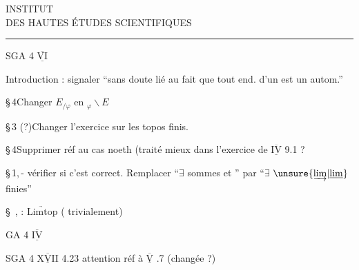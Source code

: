 
\begin{center}
INSTITUT\\
DES HAUTES ÉTUDES SCIENTIFIQUES\\
\rule{2.3em}{0.4pt}
\end{center}
SGA 4 $\underline{\overline{\mathrm{VI}}}$

Introduction : signaler  ``sans doute lié au fait que tout end. d'un  est un autom.''\unsure{)|\}}

\S\,4\qquad Changer \(E_{/\varphi}\) en \({}_{\varphi}\backslash E\)

\S\,3 (?)\qquad Changer l'exercice sur les topos finis.

\S\,4\qquad Supprimer réf au cas noeth (traité mieux dans l'exercice de $\underline{\overline{\mathrm{IV}}}$ 9.1 ?

\S\,1,\textemdash\,- vérifier si c'est correct. Remplacer ``$\exists$ sommes  et ''  par ``$\exists$ $\unsure{\underrightarrow{\mathrm{lim}}|\underline{\mathrm{lim}}}$ finies''

\S\ ,\qquad {} : $\underrightarrow{\mathrm{Limtop}}$ ( trivialement)

GA 4 $\underline{\overline{\mathrm{IV}}}$

SGA 4 $\underline{\overline{\mathrm{XVII}}}$ 4.23 attention réf à $\underline{\overline{\mathrm{V}}}$ .7 (changée ?)

